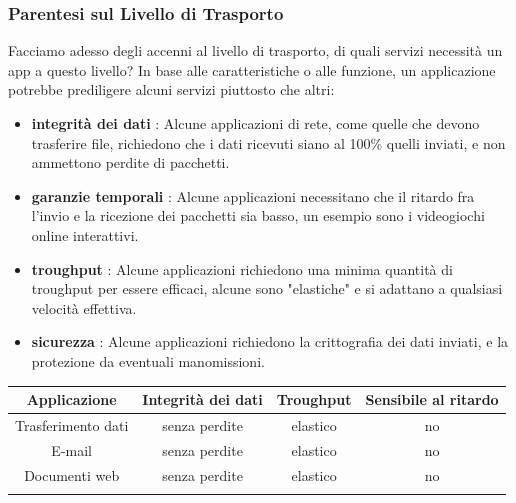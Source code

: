 \documentclass[12pt, letterpaper]{article}
\begin{document}
\subsubsection{Parentesi sul Livello di Trasporto}
Facciamo adesso degli accenni al livello di trasporto, di quali servizi necessità un app a questo livello? In 
base alle caratteristiche o alle funzione, un applicazione potrebbe prediligere alcuni servizi piuttosto che altri:\begin{itemize}
    \item \textbf{integrità dei dati} : Alcune applicazioni di rete, come quelle che devono trasferire file, 
    richiedono che i dati ricevuti siano al 100\% quelli inviati, e non ammettono perdite di pacchetti.
    \item \textbf{garanzie temporali} : Alcune applicazioni necessitano che il ritardo fra l'invio e la 
    ricezione dei pacchetti sia basso, un esempio sono i videogiochi online interattivi.
    \item \textbf{troughput} : Alcune applicazioni richiedono una minima quantità di troughput per essere 
    efficaci, alcune sono "elastiche" e si adattano a qualsiasi velocità effettiva.
    \item \textbf{sicurezza} : Alcune applicazioni richiedono la crittografia dei dati inviati, e la protezione 
    da eventuali manomissioni.
\end{itemize}\begin{center}
    \begin{tabular}{|c|c|c|c|}
        \hline
        \rowcolor[HTML]{ECF4FF} 
        \textbf{Applicazione}      & \textbf{Integrità dei dati} & \textbf{Troughput}                                                                 & \textbf{Sensibile al ritardo} \\ \hline
        Trasferimento dati         & senza perdite               & elastico                                                                           & no                            \\ \hline
        \rowcolor[HTML]{EFEFEF} 
        E-mail                     & senza perdite               & elastico                                                                           & no                            \\ \hline
        Documenti web              & senza perdite               & elastico                                                                           & no                            \\ \hline
        \rowcolor[HTML]{EFEFEF} 

\end{tabular}
\end{center}
\end{document}
